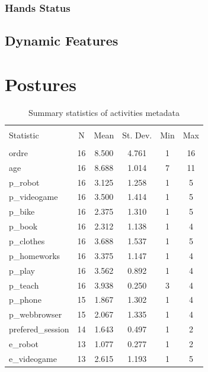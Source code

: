 \documentclass{article}
\begin{document}
\subsubsection{Hands Status}

\subsection{Dynamic Features}


\section{Postures}
\begin{table}[!htbp] \centering 
  \caption{Summary statistics of activities metadata} 
  \label{} 
\begin{tabular}{@{\extracolsep{5pt}}lccccc} 
\\[-1.8ex]\hline 
\hline \\[-1.8ex] 
Statistic & \multicolumn{1}{c}{N} & \multicolumn{1}{c}{Mean} & \multicolumn{1}{c}{St. Dev.} & \multicolumn{1}{c}{Min} & \multicolumn{1}{c}{Max} \\ 
\hline \\[-1.8ex] 
ordre & 16 & 8.500 & 4.761 & 1 & 16 \\ 
age & 16 & 8.688 & 1.014 & 7 & 11 \\ 
p\_robot & 16 & 3.125 & 1.258 & 1 & 5 \\ 
p\_videogame & 16 & 3.500 & 1.414 & 1 & 5 \\ 
p\_bike & 16 & 2.375 & 1.310 & 1 & 5 \\ 
p\_book & 16 & 2.312 & 1.138 & 1 & 4 \\ 
p\_clothes & 16 & 3.688 & 1.537 & 1 & 5 \\ 
p\_homeworks & 16 & 3.375 & 1.147 & 1 & 4 \\ 
p\_play & 16 & 3.562 & 0.892 & 1 & 4 \\ 
p\_teach & 16 & 3.938 & 0.250 & 3 & 4 \\ 
p\_phone & 15 & 1.867 & 1.302 & 1 & 4 \\ 
p\_webbrowser & 15 & 2.067 & 1.335 & 1 & 4 \\ 
prefered\_session & 14 & 1.643 & 0.497 & 1 & 2 \\ 
e\_robot & 13 & 1.077 & 0.277 & 1 & 2 \\ 
e\_videogame & 13 & 2.615 & 1.193 & 1 & 5 \\ 

\end{tabular}
\end{table}
\end{document}
